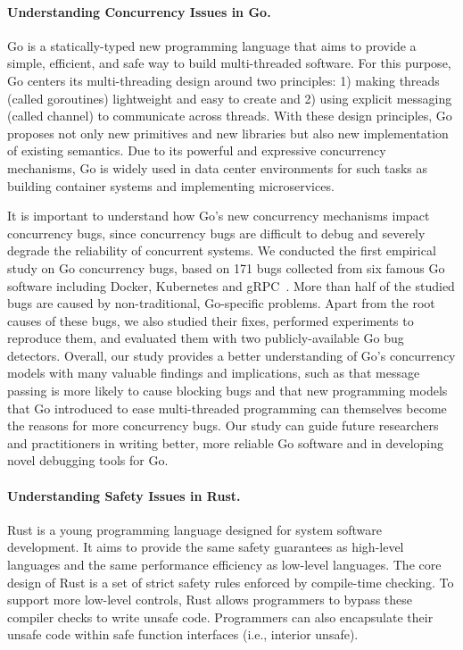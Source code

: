 \documentclass[10pt]{article}
\begin{document}
\vspace{-.1in}
\paragraph{Understanding Concurrency Issues in Go.}
Go is a statically-typed new programming language that aims to provide 
a simple, efficient, and safe way to build multi-threaded software.
For this purpose, Go centers its multi-threading design 
around two principles: 1) making threads (called goroutines) lightweight 
and easy to create and 2) using explicit messaging (called channel) 
to communicate across threads. With these design principles, 
Go proposes not only new primitives and new libraries 
but also new implementation of existing semantics.
Due to its powerful and expressive concurrency mechanisms, 
Go is widely used in data center environments for such tasks 
as building container systems and implementing microservices.

It is important to understand how Go's new concurrency mechanisms 
impact concurrency bugs, 
since concurrency bugs are difficult to debug and severely degrade 
the reliability of concurrent systems. 
We conducted the first empirical study on Go concurrency bugs, based on 171 bugs collected from  
six famous Go software 
including Docker, Kubernetes and gRPC~\cite{go-asplos}.
More than half of the studied bugs are caused by non-traditional, Go-specific problems. 
Apart from the root causes of these bugs, we also studied their fixes, 
performed experiments to reproduce them, 
and evaluated them with two publicly-available Go bug detectors.
Overall, our study provides a better understanding of Go's concurrency models
with many valuable findings and implications, such as 
that message passing is more likely to 
cause blocking bugs and that new programming models
that Go introduced to ease multi-threaded programming can themselves 
become the reasons for more concurrency bugs. 
Our study can guide future researchers and practitioners in writing better, 
more reliable Go software and in developing novel debugging tools for Go.


\vspace{-.1in}
\paragraph{Understanding Safety Issues in Rust.}
Rust is a young programming language designed for system software development. 
It aims to provide the same safety guarantees as high-level languages 
and the same performance efficiency
as low-level languages. The core design of Rust is a set
of strict safety rules enforced by compile-time checking. To
support more low-level controls, Rust allows programmers
to bypass these compiler checks to write unsafe code. 
Programmers can also encapsulate their unsafe code within safe
function interfaces (i.e., interior unsafe).
\end{document}
